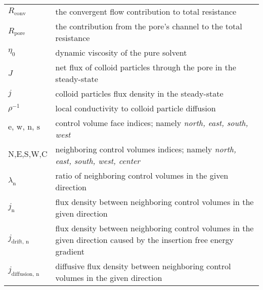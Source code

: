 \documentclass[10pt, a4paper]{article}
\begin{document}
\begin{tabularx}{\linewidth}{l l}
$R_{\textrm{conv}}$ & the convergent flow contribution to total resistance \\
$R_{\textrm{pore}}$ & the contribution from the pore's channel to the total resistance \\
$\eta_{0}$ & dynamic viscosity of the pure solvent \\
$J$ & net flux of colloid particles through the pore in the steady-state \\
$j$ & colloid particles flux density in the steady-state \\
$\rho^{-1}$ & local conductivity to colloid particle diffusion \\
$\textrm{e, w, n, s}$ & control volume face indices; namely \textit{north, east, south, west} \\
$\textrm{N,E,S,W,C}$ & neighboring control volumes indices; namely \textit{north, east, south, west, center} \\
$\lambda_{\textrm{n}}$ & ratio of neighboring control volumes in the given direction \\
$j_{\textrm{n}}$ & flux density between neighboring control volumes in the given direction \\
$j_{\textrm{drift, n}}$ & flux density between neighboring control volumes in the given direction caused by the insertion free energy gradient\\
$j_{\textrm{diffusion, n}}$ & diffusive flux density between neighboring control volumes in the given direction \\

\end{tabularx}
\end{document}
